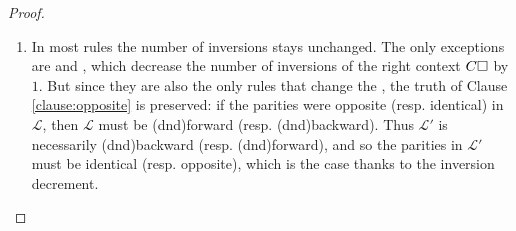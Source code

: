 \begin{proof}
\begin{enumerate}[itemsep=0.8em]
\begin{itemize}
      \begin{enumerate}[itemsep=0.4em]
        \renewcommand{\labelenumii}{\theenumii}
        \renewcommand{\theenumii}{\arabic{enumii}.}
            
        \item In most rules the number of inversions stays unchanged. The only
        exceptions are  and , which
        decrease the number of inversions of the right context $C\square$ by $1$.
        But since they are also the only rules that change the ,
        the truth of Clause \ref{clause:opposite} is preserved: if the parities
        were opposite (resp. identical) in $\mathcal{L}$, then $\mathcal{L}$
        must be \kl(dnd){forward} (resp. \kl(dnd){backward}). Thus $\mathcal{L'}$ is necessarily
        \kl(dnd){backward} (resp. \kl(dnd){forward}), and so the parities in $\mathcal{L'}$ must be
        identical (resp. opposite), which is the case thanks to the inversion
        decrement.


\end{enumerate}
\end{itemize}
\end{enumerate}
\end{proof}
